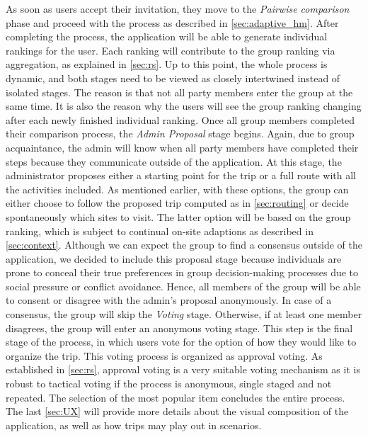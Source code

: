 \documentclass[11pt,a4paper,oneside]{article}
\begin{document}
As soon as users accept their invitation, they move to the \emph{Pairwise comparison} phase and proceed with the process as described in \autoref{sec:adaptive_hm}. After completing the process, the application will be able to generate individual rankings for the user. Each ranking will contribute to the group ranking via aggregation, as explained in \autoref{sec:rs}. Up to this point, the whole process is dynamic, and both stages need to be viewed as closely intertwined instead of isolated stages. The reason is that not all party members enter the group at the same time. It is also the reason why the users will see the group ranking changing after each newly finished individual ranking. Once all group members completed their comparison process, the \emph{Admin Proposal} stage begins. Again, due to group acquaintance, the admin will know when all party members have completed their steps because they communicate outside of the application. At this stage, the administrator proposes either a starting point for the trip or a full route with all the activities included. As mentioned earlier, with these options, the group can either choose to follow the proposed trip computed as in \autoref{sec:routing} or decide spontaneously which sites to visit. The latter option will be based on the group ranking, which is subject to continual on-site adaptions as described in \autoref{sec:context}. Although we can expect the group to find a consensus outside of the application, we decided to include this proposal stage because individuals are prone to conceal their true preferences in group decision-making processes due to social pressure or conflict avoidance. Hence, all members of the group will be able to consent or disagree with the admin's proposal anonymously. In case of a consensus, the group will skip the \emph{Voting} stage. Otherwise, if at least one member disagrees, the group will enter an anonymous voting stage. This step is the final stage of the process, in which users vote for the option of how they would like to organize the trip. This voting process is organized as approval voting. As established in \autoref{sec:rs}, approval voting is a very suitable voting mechanism as it is robust to tactical voting if the process is anonymous, single staged and not repeated. The selection of the most popular item concludes the entire process. The last \autoref{sec:UX} will provide more details about the visual composition of the application, as well as how trips may play out in scenarios.  
\end{document}
